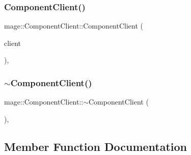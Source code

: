\hypertarget{classmage_1_1_component_client_a61b665792bc87ae0c1ffbb2a7c66d3d6}{}\label{classmage_1_1_component_client_a61b665792bc87ae0c1ffbb2a7c66d3d6} 
\subsubsection{\texorpdfstring{Component\+Client()}{ComponentClient()}\hspace{0.1cm}{\footnotesize\ttfamily [3/3]}}
{\footnotesize\ttfamily mage\+::\+Component\+Client\+::\+Component\+Client (\begin{DoxyParamCaption}\item[{\hyperlink{classmage_1_1_component_client}{Component\+Client} \&\&}]{client }\end{DoxyParamCaption})\hspace{0.3cm}{\ttfamily [private]}, {\ttfamily [delete]}}

\hypertarget{classmage_1_1_component_client_a0f2f74a012d7aa1ad1fbef21b52da159}{}\label{classmage_1_1_component_client_a0f2f74a012d7aa1ad1fbef21b52da159} 
\subsubsection{\texorpdfstring{$\sim$\+Component\+Client()}{~ComponentClient()}}
{\footnotesize\ttfamily mage\+::\+Component\+Client\+::$\sim$\+Component\+Client (\begin{DoxyParamCaption}{ }\end{DoxyParamCaption})\hspace{0.3cm}{\ttfamily [private]}, {\ttfamily [delete]}}



\subsection{Member Function Documentation}
\hypertarget{classmage_1_1_component_client_afababa2252823c58c9ddcc7ff6703b46}{}\label{classmage_1_1_component_client_afababa2252823c58c9ddcc7ff6703b46} 
